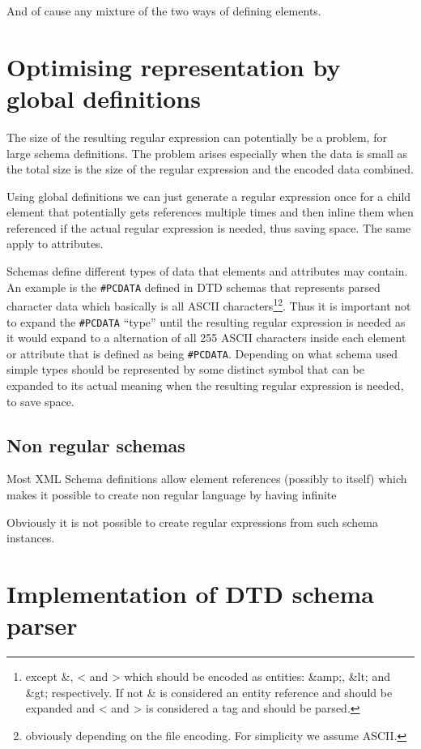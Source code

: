 \documentclass[a4paper, oneside]{memoir}
\theoremstyle{definition}
\begin{document}
And of cause any mixture of the two ways of defining elements.

\section{Optimising representation by global definitions}

The size of the resulting regular expression can potentially be a problem, for
large schema definitions. The problem arises especially when the data is small
as the total size is the size of the regular expression and the encoded data
combined.

Using global definitions we can just generate a regular expression once for a
child element that potentially gets references multiple times and then inline
them when referenced if the actual regular expression is needed, thus saving
space. The same apply to attributes.
\label{sec:global-definitions-save-space}

Schemas define different types of data that elements and attributes may
contain. An example is the \texttt{\#PCDATA} defined in DTD schemas that
represents parsed character data which basically is all ASCII
characters\footnote{except \&, < and > which should be encoded as entities:
  \&amp;, \&lt; and \&gt; respectively. If not \& is considered an entity
  reference and should be expanded and < and > is considered a tag and should be
  parsed.}\footnote{obviously depending on the file encoding. For simplicity we
  assume ASCII.}. Thus it is important not to expand the \texttt{\#PCDATA}
``type'' until the resulting regular expression is needed as it would expand to
a alternation of all 255 ASCII characters inside each element or attribute that
is defined as being \texttt{\#PCDATA}. Depending on what schema used simple
types should be represented by some distinct symbol that can be expanded to its
actual meaning when the resulting regular expression is needed, to save space.

\subsection{ Non regular schemas}

Most XML Schema definitions allow element references (possibly to itself) which
makes it possible to create non regular language by having infinite

Obviously it is not possible to create regular expressions from such schema
instances.

\section{Implementation of DTD schema parser}
\end{document}
